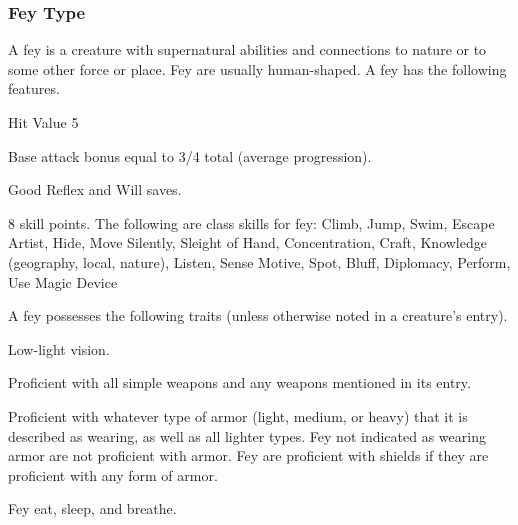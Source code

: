 \subsubsection{Fey Type} A fey is a creature with supernatural abilities and connections to nature or to some other force or place. Fey are usually human-shaped.
 A fey has the following features.
\begin{itemize*}
\item Hit Value 5
\item Base attack bonus equal to 3/4 total  (average progression).
\item Good Reflex and Will saves.
\item 8 skill points. The following are class skills for fey: Climb, Jump, Swim, Escape Artist, Hide, Move Silently, Sleight of Hand, Concentration, Craft, Knowledge (geography, local, nature), Listen, Sense Motive, Spot, Bluff, Diplomacy, Perform, Use Magic Device
\end{itemize*}
 A fey possesses the following traits (unless otherwise noted in a creature's entry).
\begin{itemize*}
\item Low-light vision.
\item Proficient with all simple weapons and any weapons mentioned in its entry.
\item Proficient with whatever type of armor (light, medium, or heavy) that it is described as wearing, as well as all lighter types. Fey not indicated as wearing armor are not proficient with armor. Fey are proficient with shields if they are proficient with any form of armor.
\item Fey eat, sleep, and breathe.
\end{itemize*}

